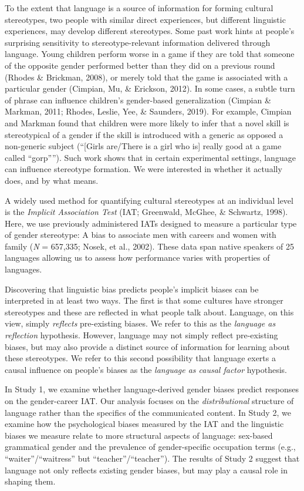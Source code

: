 \documentclass[man,floatsintext]{apa6}
\begin{document}
To the extent that language is a source of information for forming cultural stereotypes, two people with similar direct experiences, but different linguistic experiences, may develop different stereotypes. Some past work hints at people's surprising sensitivity to stereotype-relevant information delivered through language. Young children perform worse in a game if they are told that someone of the opposite gender performed better than they did on a previous round (Rhodes \& Brickman, 2008), or merely told that the game is associated with a particular gender (Cimpian, Mu, \& Erickson, 2012). In some cases, a subtle turn of phrase can influence children's gender-based generalization (Cimpian \& Markman, 2011; Rhodes, Leslie, Yee, \& Saunders, 2019). For example, Cimpian and Markman found that children were more likely to infer that a novel skill is stereotypical of a gender if the skill is introduced with a generic as opposed a non-generic subject (``{[}Girls are/There is a girl who is{]} really good at a game called \enquote{gorp''}). Such work shows that in certain experimental settings, language can influence stereotype formation. We were interested in whether it actually does, and by what means.

A widely used method for quantifying cultural stereotypes at an individual level is the \emph{Implicit Association Test} (IAT; Greenwald, McGhee, \& Schwartz, 1998). Here, we use previously administered IATs designed to measure a particular type of gender stereotype: A bias to associate men with careers and women with family (\emph{N} = 657,335; Nosek, et al., 2002). These data span native speakers of 25 languages allowing us to assess how performance varies with properties of languages.

Discovering that linguistic bias predicts people's implicit biases can be interpreted in at least two ways. The first is that some cultures have stronger stereotypes and these are reflected in what people talk about. Language, on this view, simply \emph{reflects} pre-existing biases. We refer to this as the \emph{language as reflection} hypothesis. However, language may not simply reflect pre-existing biases, but may also provide a distinct source of information for learning about these stereotypes. We refer to this second possibility that language exerts a causal influence on people's biases as the \emph{language as causal factor} hypothesis.

In Study 1, we examine whether language-derived gender biases predict responses on the gender-career IAT. Our analysis focuses on the \emph{distributional} structure of language rather than the specifics of the communicated content. In Study 2, we examine how the psychological biases measured by the IAT and the linguistic biases we measure relate to more structural aspects of language: sex-based grammatical gender and the prevalence of gender-specific occupation terms (e.g., \enquote{waiter}/\enquote{waitress} but \enquote{teacher}/\enquote{teacher}). The results of Study 2 suggest that language not only reflects existing gender biases, but may play a causal role in shaping them.
\end{document}
